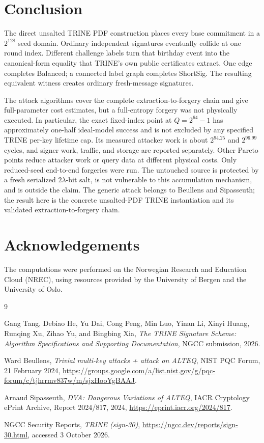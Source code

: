 \documentclass[11pt,a4paper]{article}
\begin{document}
\section{Conclusion}

The direct unsalted TRINE PDF construction places every base commitment in a
$2^{128}$ seed domain.  Ordinary independent signatures eventually collide at
one round index.  Different challenge labels turn that birthday event into the
canonical-form equality that TRINE's own public certificates extract.  One
edge completes Balanced; a connected label graph completes ShortSig.  The
resulting equivalent witness creates ordinary fresh-message signatures.

The attack algorithms cover the complete extraction-to-forgery chain and give
full-parameter cost estimates, but a full-entropy forgery was not physically
executed.  In particular, the exact fixed-index point at $Q=2^{64}-1$ has
approximately one-half ideal-model success and is not excluded by any
specified TRINE per-key lifetime cap.  Its measured attacker work is about
$2^{94.25}$ and $2^{96.99}$ cycles, and signer work, traffic, and storage are
reported separately.  Other Pareto points reduce attacker work or query data
at different physical costs.  Only reduced-seed end-to-end forgeries were
run.  The untouched source is protected by a fresh serialized
$2\lambda$-bit salt, is not vulnerable to this accumulation mechanism, and is
outside the claim.  The generic attack belongs to Beullens and Sipasseuth; the
result here is the concrete unsalted-PDF TRINE instantiation and its validated
extraction-to-forgery chain.

\section*{Acknowledgements}

The computations were performed on the Norwegian Research and Education Cloud
(NREC), using resources provided by the University of Bergen and the University
of Oslo.

\begin{thebibliography}{9}
\small

Gang Tang, Debiao He, Yu Dai, Cong Peng, Min Luo, Yinan Li, Xinyi Huang,
Runqing Xu, Zihao Yu, and Bingbing Xia,
\emph{The TRINE Signature Scheme: Algorithm Specifications and Supporting
Documentation}, NGCC submission, 2026.

Ward Beullens,
\emph{Trivial multi-key attacks + attack on ALTEQ},
NIST PQC Forum, 21 February 2024,
\url{https://groups.google.com/a/list.nist.gov/g/pqc-forum/c/tjhrrmv837w/m/sjxHooYgBAAJ}.

Arnaud Sipasseuth,
\emph{DVA: Dangerous Variations of ALTEQ},
IACR Cryptology ePrint Archive, Report 2024/817, 2024,
\url{https://eprint.iacr.org/2024/817}.

NGCC Security Reports,
\emph{TRINE (sign-30)},
\url{https://ngcc.dev/reports/sign-30.html}, accessed 3 October 2026.

\end{thebibliography}
\end{document}
